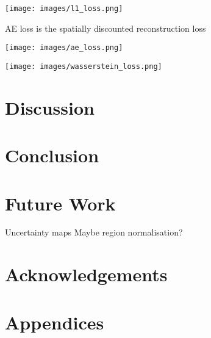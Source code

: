 \documentclass[twocolumn]{article}
\begin{document}
\begin{center}
\texttt{[image: images/l1\_loss.png]}
\end{center}

AE loss is the spatially discounted reconstruction loss\autocite{zhangVoidFillingBased2020}
\begin{center}
\texttt{[image: images/ae\_loss.png]}
\end{center}

\begin{center}
\texttt{[image: images/wasserstein\_loss.png]}
\end{center}


\section{Discussion}
\label{sec:orga95bb57}

\section{Conclusion}
\label{sec:orga91458e}

\section{Future Work}
\label{sec:org75cc613}

Uncertainty maps
Maybe region normalisation?\autocite{yuRegionNormalizationImage2023}

\section*{Acknowledgements}

\printbibliography

\section*{Appendices}
\end{document}
